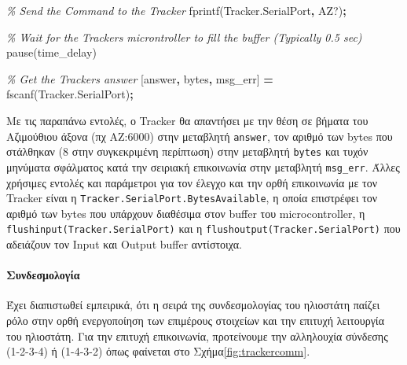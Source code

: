 \documentclass[
  a4paper,
  twoside,
  titlepage,
  11pt]{article}
\newenvironment{Shaded}{\begin{snugshade}}{\end{snugshade}}
\newcommand{\CommentTok}[1]{\textcolor[rgb]{0.56,0.35,0.01}{\textit{#1}}}
\newcommand{\NormalTok}[1]{#1}
\newcommand{\OperatorTok}[1]{\textcolor[rgb]{0.81,0.36,0.00}{\textbf{#1}}}
\newcommand{\SpecialStringTok}[1]{\textcolor[rgb]{0.31,0.60,0.02}{#1}}
\newcommand{\VariableTok}[1]{\textcolor[rgb]{0.00,0.00,0.00}{#1}}
\numberwithin{equation}{section}
\numberwithin{figure}{section}
\numberwithin{table}{section}
\begin{document}
\begin{Shaded}
\begin{Highlighting}[]
\CommentTok{\% Send the Command to the Tracker}
\VariableTok{fprintf}\NormalTok{(}\VariableTok{Tracker}\NormalTok{.}\VariableTok{SerialPort}\OperatorTok{,} \SpecialStringTok{\textquotesingle{}AZ?\textquotesingle{}}\NormalTok{)}\OperatorTok{;}
\end{Highlighting}
\end{Shaded}

\begin{Shaded}
\begin{Highlighting}[]
\CommentTok{\% Wait for the Tracker\textquotesingle{}s microntroller to fill the buffer (Typically 0.5 sec)}
\VariableTok{pause}\NormalTok{(}\VariableTok{time\_delay}\NormalTok{)}
\end{Highlighting}
\end{Shaded}

\begin{Shaded}
\begin{Highlighting}[]
\CommentTok{\% Get the Tracker\textquotesingle{}s answer}
\NormalTok{[}\VariableTok{answer}\OperatorTok{,} \VariableTok{bytes}\OperatorTok{,} \VariableTok{msg\_err}\NormalTok{] }\OperatorTok{=} \VariableTok{fscanf}\NormalTok{(}\VariableTok{Tracker}\NormalTok{.}\VariableTok{SerialPort}\NormalTok{)}\OperatorTok{;}
\end{Highlighting}
\end{Shaded}

Με τις παραπάνω εντολές, ο Tracker θα απαντήσει με την θέση σε βήματα του Αζιμούθιου
άξονα (πχ AZ:6000) στην μεταβλητή \texttt{answer}, τον αριθμό των bytes που στάλθηκαν (8
στην συγκεκριμένη περίπτωση) στην μεταβλητή \texttt{bytes} και τυχόν μηνύματα σφάλματος κατά
την σειριακή επικοινωνία στην μεταβλητή \texttt{msg\_err}. Άλλες χρήσιμες εντολές και
παράμετροι για τον έλεγχο και την ορθή επικοινωνία με τον Tracker είναι η
\texttt{Tracker.SerialPort.BytesAvailable}, η οποία επιστρέφει τον αριθμό των bytes που
υπάρχουν διαθέσιμα στον buffer του microcontroller, η
\texttt{flushinput(Tracker.SerialPort)} και η \texttt{flushoutput(Tracker.SerialPort)} που
αδειάζουν τον Input και Output buffer αντίστοιχα.

\hypertarget{tracker_connection}{%
\paragraph{Συνδεσμολογία}\label{tracker_connection}}

Έχει διαπιστωθεί εμπειρικά, ότι η σειρά της συνδεσμολογίας του ηλιοστάτη παίζει ρόλο
στην ορθή ενεργοποίηση των επιμέρους στοιχείων και την επιτυχή λειτουργία του
ηλιοστάτη. Για την επιτυχή επικοινωνία, προτείνουμε την αλληλουχία σύνδεσης (1-2-3-4)
ή (1-4-3-2) όπως φαίνεται στο Σχήμα\nobreakspace{}\ref{fig:trackercomm}.
\end{document}

